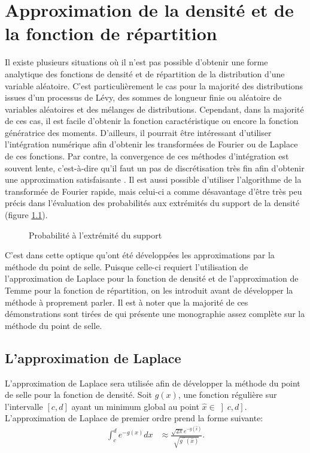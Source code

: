 \chapter{Approximation de la densité et de la fonction de
  répartition} %

Il existe plusieurs situations où il n'est pas possible d'obtenir une
forme analytique des fonctions de densité et de répartition de la
distribution d'une variable aléatoire. C'est particulièrement le cas
pour la majorité des distributions issues d'un processus de Lévy, des
sommes de longueur finie ou aléatoire de variables aléatoires et des
mélanges de distributions. Cependant, dans la majorité de ces cas, il
est facile d'obtenir la fonction caractéristique ou encore la fonction
génératrice des moments. D'ailleurs, il pourrait être intéressant
d'utiliser l'intégration numérique afin d'obtenir les transformées de
Fourier ou de Laplace de ces fonctions. Par contre, la convergence de
ces méthodes d'intégration est souvent lente, c'est-à-dire qu'il faut
un pas de discrétisation très fin afin d'obtenir une approximation
satisfaisante \citep{lugannani1980saddle}. Il est aussi possible
d'utiliser l'algorithme de la transformée de Fourier rapide, mais
celui-ci a comme désavantage d'être très peu précis dans l'évaluation
des probabilités aux extrémités du support de la densité (figure
\ref{fig:probdroite}).
\begin{figure}[!ht]
  \centering 
  \caption{Probabilité à l'extrémité du support}
  \label{fig:probdroite}
\end{figure}

C'est dans cette optique qu'ont été développées les approximations par
la méthode du point de selle. Puisque celle-ci requiert l'utilisation
de l'approximation de Laplace pour la fonction de densité et de
l'approximation de Temme pour la fonction de répartition, on les
introduit avant de développer la méthode à proprement parler. Il est à
noter que la majorité de ces démonstrations sont tirées de
\cite{butler2007saddlepoint} qui présente une monographie assez
complète sur la méthode du point de selle.

\section{L'approximation de Laplace}
\label{sec:appr-de-lapl}

L'approximation de Laplace sera utilisée afin de développer la méthode
du point de selle pour la fonction de densité.  Soit $g(x)$, une
fonction régulière sur l'intervalle $\left[c,d\right]$ ayant un
minimum global au point $\hat{x} \in
\left]c,d\right]$. L'approximation de Laplace de premier ordre prend
la forme suivante:
\begin{align}
  \label{eq:approxlaplace1}
  \int_{c}^{d} e^{-g(x)}dx &\approx
  \frac{\sqrt{2\pi}e^{-g(\hat{x})}}{\sqrt{g^{\prime\prime}(\hat{x})}}.
\end{align}

